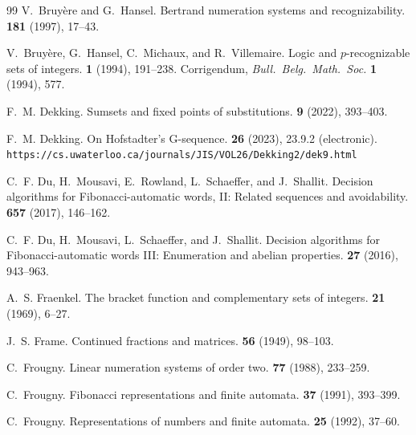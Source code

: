 \documentclass[12pt,reqno]{article}
\begin{document}
\begin{thebibliography}{99}
V.~{Bruy\`ere} and G.~Hansel.
\newblock Bertrand numeration systems and recognizability.
 {\bf 181} (1997), 17--43.

V.~{Bruy\`ere}, G.~Hansel, C.~Michaux, and R.~Villemaire.
\newblock Logic and $p$-recognizable sets of integers.
 {\bf 1} (1994), 191--238.
\newblock Corrigendum, {\it Bull.\ Belg.\ Math.\ Soc.} {\bf 1} (1994), 577.

F.~M. Dekking.
\newblock Sumsets and fixed points of substitutions.
 {\bf 9} (2022), 393--403.

F.~M. Dekking.
\newblock On {Hofstadter}'s {G}-sequence.
 {\bf 26} (2023), 23.9.2 (electronic).
\newblock \verb!https://cs.uwaterloo.ca/journals/JIS/VOL26/Dekking2/dek9.html!

C.~F. Du, H.~Mousavi, E.~Rowland, L.~Schaeffer, and J.~Shallit.
\newblock Decision algorithms for {Fibonacci-automatic} words, {II}: Related
  sequences and avoidability.
 {\bf 657} (2017), 146--162.

C.~F. Du, H.~Mousavi, L.~Schaeffer, and J.~Shallit.
\newblock Decision algorithms for {Fibonacci}-automatic words {III}:
  Enumeration and abelian properties.
 {\bf 27} (2016), 943--963.

A.~S. Fraenkel.
\newblock The bracket function and complementary sets of integers.
 {\bf 21} (1969), 6--27.

J.~S. Frame.
\newblock Continued fractions and matrices.
 {\bf 56} (1949), 98--103.

C.~Frougny.
\newblock Linear numeration systems of order two.
 {\bf 77} (1988), 233--259.

C.~Frougny.
\newblock Fibonacci representations and finite automata.
 {\bf 37} (1991), 393--399.

C.~Frougny.
\newblock Representations of numbers and finite automata.
 {\bf 25} (1992), 37--60.


\end{thebibliography}
\end{document}
